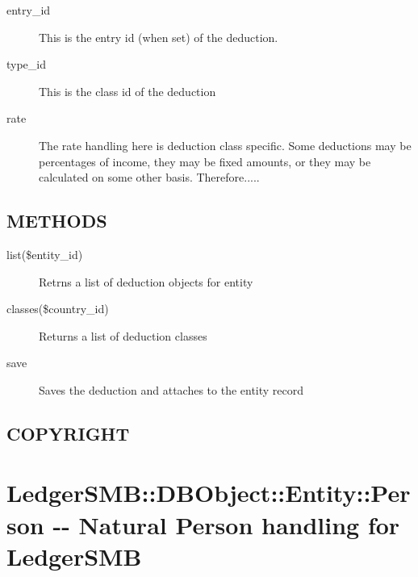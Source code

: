 \begin{description}
\begin{description}
\begin{description}
\begin{description}
\begin{description}
\begin{description}
\begin{description}
\begin{description}
\begin{description}
\item[{entry\_id}] \mbox{}

This is the entry id (when set) of the deduction.


\item[{type\_id}] \mbox{}

This is the class id of the deduction


\item[{rate}] \mbox{}

The rate handling here is deduction class specific.  Some deductions may be 
percentages of income, they may be fixed amounts, or they may be calculated on 
some other basis.  Therefore.....

\end{description}
\subsection*{METHODS\label{LedgerSMB::DBObject::Entity::Payroll::Deduction_METHODS}}
\begin{description}

\item[{list(\$entity\_id)}] \mbox{}

Retrns a list of  deduction objects for entity


\item[{classes(\$country\_id)}] \mbox{}

Returns a list of deduction classes


\item[{save}] \mbox{}

Saves the deduction and attaches to the entity record

\end{description}
\subsection*{COPYRIGHT\label{LedgerSMB::DBObject::Entity::Payroll::Deduction_COPYRIGHT}}
\section{LedgerSMB::DBObject::Entity::Person -{}- Natural Person handling for LedgerSMB\label{LedgerSMB::DBObject::Entity::Person_-_-_Natural_Person_handling_for_LedgerSMB}}





\end{description}
\end{description}
\end{description}
\end{description}
\end{description}
\end{description}
\end{description}
\end{description}
